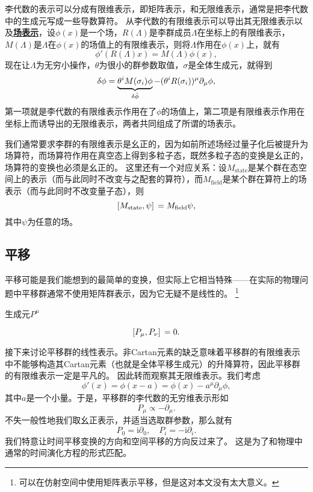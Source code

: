 \documentclass[hyperref, UTF8, a4paper]{ctexart}
\newcommand*{\ii}{\mathrm{i}}
\newcommand{\concept}[1]{\underline{\textbf{#1}}}
\begin{document}
李代数的表示可以分成有限维表示，即矩阵表示，和无限维表示，通常是把李代数中的生成元写成一些导数算符。
从李代数的有限维表示可以导出其无限维表示以及\concept{场表示}，设$\phi(x)$是一个场，$R(\Lambda)$是李群成员$\Lambda$在坐标上的有限维表示，$M(\Lambda)$是$\Lambda$在$\phi(x)$的场值上的有限维表示，则将$\Lambda$作用在$\phi(x)$上，就有
\[
    \phi'(R(\Lambda) x) = M(\Lambda) \phi(x),
\]
现在让$\Lambda$为无穷小操作，$\theta$为很小的群参数取值，$\sigma$是全体生成元，就得到
\begin{equation}
    \var{\phi} = \underbrace{\theta^i M(\sigma_i) \phi}_{\var{\bar{\phi}}} - (\theta^i R(\sigma_i))^\mu \partial_\mu \phi,
\end{equation}
第一项就是李代数的有限维表示作用在了$\phi$的场值上，第二项是有限维表示作用在坐标上而诱导出的无限维表示，两者共同组成了所谓的场表示。

我们通常要求李群的有限维表示是幺正的，因为如前所述场经过量子化后被提升为场算符，而场算符作用在真空态上得到多粒子态，既然多粒子态的变换是幺正的，场算符的变换也必须是幺正的。
这里还有一个对应关系：设$M_\text{state}$是某个群在态空间上的表示（而与此同时不改变与之配套的算符），而$M_\text{field}$是某个群在算符上的场表示（而与此同时不改变量子态），则
\begin{equation}
    \comm*{M_\text{state}}{\psi} = M_\text{field} \psi,
    \label{eq:field-and-state-corr}
\end{equation}
其中$\psi$为任意的场。

\subsection{平移}\label{sec:translation}

平移可能是我们能想到的最简单的变换，但实际上它相当特殊——在实际的物理问题中平移群通常不使用矩阵群表示，因为它无疑不是线性的。%
\footnote{可以在仿射空间中使用矩阵表示平移，但是这对本文没有太大意义。}

生成元$P^\mu$

\begin{equation}
    \comm*{P_\mu}{P_\nu} = 0.
    \label{eq:comm-of-trans}
\end{equation}

接下来讨论平移群的线性表示。非Cartan元素的缺乏意味着平移群的有限维表示中不能够构造其Cartan元素（也就是全体平移生成元）的升降算符，因此平移群的有限维表示一定是平凡的。
因此转而观察其无限维表示。我们考虑
\[
    \phi'(x) = \phi(x - a) = \phi(x) - a^\mu \partial_\mu \phi,
\]
其中$a$是一个小量。于是，平移群的李代数的无穷维表示形如
\[
    P_\mu \propto - \partial_\mu.
\]
不失一般性地我们取幺正表示，并适当选取群参数，那么就有
\begin{equation}
    P_0 = \ii \partial_0, \quad P_i = - \ii \partial_i.
    \label{eq:transition-inf-rep}
\end{equation}
我们特意让时间平移变换的方向和空间平移的方向反过来了。
这是为了和物理中通常的时间演化方程的形式匹配。
\end{document}
